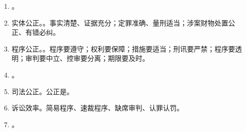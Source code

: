 \begin{enumerate}
\begin{enumerate}
                \begin{enumerate}
                  \item 无辜的人不受追究；有罪的人受到公正处罚；诉讼权利得到充分保障和行使。
                  \item 制度涉及。辩护权、法院援助、非法证据排除。
                \end{enumerate}
          \item {}。
          \item 实体公正。。事实清楚、证据充分；定罪准确、量刑适当；涉案财物处置公正、有错必纠。
          \item 程序公正。。程序要遵守；权利要保障；措施要适当；刑讯要严禁；程序要透明；审判要中立、控审要分离；期限要及时。
          \item {}。
          \item 司法公正。公正是。
          \item 诉讼效率。简易程序、速裁程序、缺席审判、认罪认罚。
          \item {}。
        \end{enumerate}
\end{enumerate}
